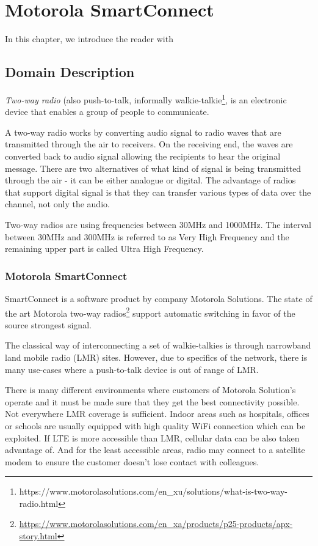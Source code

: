 \chapter{Motorola SmartConnect}
In this chapter, we introduce the reader with 

\section{Domain Description}

\textit{Two-way radio} (also push-to-talk, informally walkie-talkie\footnote{https://www.motorolasolutions.com/en\_xu/solutions/what-is-two-way-radio.html}, is an electronic device that enables a group of people to communicate.

A two-way radio works by converting audio signal to radio waves that are transmitted through the air to receivers. On the receiving end, the waves are converted back to audio signal allowing the recipients to hear the original message.
There are two alternatives of what kind of signal is being transmitted through the air - it can be either analogue or digital.
The advantage of radios that support digital signal is that they can transfer various types of data over the channel, not only the audio.

Two-way radios are using frequencies between 30MHz and 1000MHz. The interval between 30MHz and 300MHz is referred to as Very High Frequency and the remaining upper part is called Ultra High Frequency.



\subsection{Motorola SmartConnect}

SmartConnect is a software product by company Motorola Solutions. 
The state of the art Motorola two-way radios\footnote{\url{https://www.motorolasolutions.com/en_xa/products/p25-products/apx-story.html}} support automatic switching in favor of the source strongest signal.


The classical way of interconnecting a set of walkie-talkies is through narrowband land mobile radio (LMR) sites.
However, due to specifics of the network, there is many use-cases where a push-to-talk device is out of range of LMR. 

There is many different environments where customers of Motorola Solution's operate and it must be made sure that they get the best connectivity possible. Not everywhere LMR coverage is sufficient.  Indoor areas such as hospitals, offices or schools are usually equipped with high quality WiFi connection which can be exploited. If LTE is more accessible than LMR, cellular data can be also taken advantage of. And for the least accessible areas, radio may connect to a satellite modem to ensure the customer doesn't lose contact with colleagues. 

